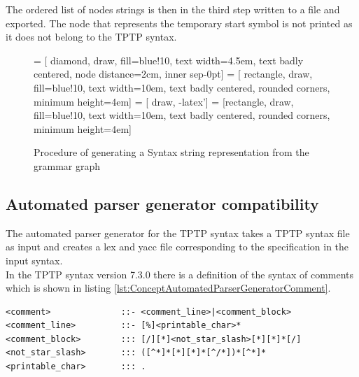 The ordered list of nodes strings is then in the third step written to a file and exported.
The node that represents the temporary start symbol is not printed as it does not belong to the \ac{TPTP} syntax. 

 
\begin{figure}[H]
 = [ diamond, draw, fill=blue!10, text width=4.5em, text badly centered, node distance=2cm, inner sep-0pt]  
 = [ rectangle, draw, fill=blue!10, text width=10em, text badly centered, rounded corners, minimum height=4em]  
 = [ draw, -latex']  
 = [rectangle, draw, fill=blue!10, text width=10em, text badly centered, rounded corners, minimum height=4em]  
\begin{center}
\end{center}
\caption{Procedure of generating a Syntax string representation from the grammar graph}
\label{fig:ConceptOutputGrammarGraphProcedure}
\end{figure}

\subsection{Automated parser generator compatibility}\label{sec:ConceptAutomatedParserGenerator}
The automated parser generator for the \ac{TPTP} syntax \cite{VS06} takes a \ac{TPTP} syntax file as input and creates a lex and yacc file corresponding to the specification in the input syntax.\\
In the \ac{TPTP} syntax version 7.3.0 there is a definition of the syntax of comments which is shown in listing \ref{lst:ConceptAutomatedParserGeneratorComment}.
\begin{lstlisting}[language=none, basicstyle=\scriptsize, caption=Comment syntax definition in the \ac{TPTP} syntax, label= lst:ConceptAutomatedParserGeneratorComment]
<comment>              ::- <comment_line>|<comment_block> 
<comment_line>         ::- [%]<printable_char>*
<comment_block>        ::: [/][*]<not_star_slash>[*][*]*[/]
<not_star_slash>       ::: ([^*]*[*][*]*[^/*])*[^*]*
<printable_char>       ::: .
\end{lstlisting}

